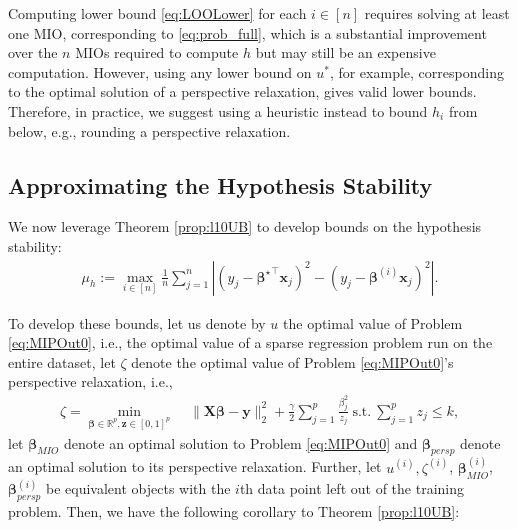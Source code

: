 \documentclass[opre,nonblindrev]{informs3} %
\begin{document}
\begin{remark}
	Computing lower bound \eqref{eq:LOOLower} for each $i\in [n]$ requires solving at least one MIO, corresponding to \eqref{eq:prob_full}, which is a substantial improvement over the $n$ MIOs required to compute $h$ but may still be an expensive computation. However, using any lower bound on $u^*$, for example, corresponding to the optimal solution of a perspective relaxation, gives valid lower bounds. Therefore, in practice, we suggest using a heuristic instead to bound $h_i$ from below, e.g., rounding a perspective relaxation.
\end{remark}
\subsection{Approximating the Hypothesis Stability} \label{ssec:genbounds2}

We now leverage Theorem \ref{prop:l10UB} to develop bounds on the hypothesis stability:
\begin{align*}
\mu_h:=\max_{i\in [n]}\frac{1}{n}\sum_{j=1}^n \left\vert (y_j-{\bm{\beta}^\star}^\top \bm{x}_j)^2-(y_j-\bm{\beta}^{(i)} \bm{x}_j)^2\right\vert.
\end{align*}

To develop these bounds, let us denote by $u$ the optimal value of Problem \eqref{eq:MIPOut0}, i.e., the optimal value of a sparse regression problem run on the entire dataset, let $\zeta$ denote the optimal value of Problem \eqref{eq:MIPOut0}'s perspective relaxation, i.e.,
\begin{align*}
	\zeta=\min_{\bm{\beta}\in \mathbb{R}^p,\bm{z}\in [0,1]^p}\;& \|\bm{X}\bm{\beta}-\bm{y}\|_2^2+\frac{\gamma}{2}\sum_{j=1}^p \frac{\beta_j^2}{z_j}\ \text{s.t.}\ \sum_{j=1}^p z_j\leq k,
\end{align*} 
let $\bm{\beta}_{MIO}$ denote an optimal solution to Problem \eqref{eq:MIPOut0} and $\bm{\beta}_{persp}$ denote an optimal solution to its perspective relaxation. Further, let $u^{(i)}, \zeta^{(i)}$, $\bm{\beta}^{(i)}_{MIO}$, $\bm{\beta}^{(i)}_{persp}$ be equivalent objects with the $i$th data point left out of the training problem. Then, we have the following corollary to Theorem \ref{prop:l10UB}:
\end{document}
